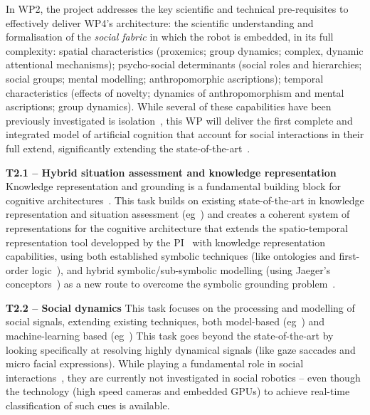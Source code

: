 \documentclass[11pt,a4paper]{report}
\begin{document}
In WP2, the project addresses the key scientific and technical pre-requisites to
effectively deliver WP4's architecture:  the scientific understanding and
formalisation of the \emph{social fabric} in which the robot is embedded, in its
full complexity: spatial characteristics (proxemics; group dynamics; complex,
dynamic attentional mechanisms); psycho-social determinants (social roles and
hierarchies; social groups; mental modelling; anthropomorphic ascriptions);
temporal characteristics (effects of novelty; dynamics of anthropomorphism and
mental ascriptions; group dynamics).  While several of these capabilities have
been previously investigated is isolation~\cite{lemaignan2014dynamics,
flook2019impact,lemaignan2015youre, fink2014which, ros2010which,
warnier2012when, lemaignan2015mutual, dillenbourg2016symmetry,
winkle2019effective}, this WP will deliver the first complete and integrated
model of artificial cognition that account for social interactions in their full
extend, significantly extending the state-of-the-art~\cite{lemaignan2017artificial,
baxter2016cognitive}.


\textbf{T2.1 -- Hybrid situation assessment and knowledge representation}
Knowledge representation and grounding is a fundamental building block for
cognitive architectures~\cite{lemaignan2017artificial,beetz2010cram}. This task
builds on existing state-of-the-art in knowledge representation and situation
assessment (eg~\cite{citeneeded}) and creates a coherent system of
representations for the cognitive architecture that extends the 
spatio-temporal representation tool developped by the
PI~\cite{lemaignan2018underworlds,sallami2019simulation} with knowledge
representation capabilities, using both established symbolic techniques (like
ontologies and first-order logic~\cite{lemaignan2010oro, tenorth2009knowrob}),
and hybrid symbolic/sub-symbolic modelling (using Jaeger's
conceptors~\cite{jaeger2014controlling}) as a new route to overcome the symbolic
grounding problem~\cite{harnad1990symbol}.

\textbf{T2.2 -- Social dynamics} This task focuses on the processing and
modelling of social signals, extending existing techniques, both model-based
(eg~\cite{lemaignan2016realtime,others}) and machine-learning based
(eg~\cite{chetouani,others}) This task goes beyond the state-of-the-art by
looking specifically at resolving highly dynamical signals (like gaze saccades
and micro facial expressions). While playing a fundamental role in social
interactions~\cite{citeneeded}, they are currently not investigated in social
robotics -- even though the technology (high speed cameras and embedded GPUs) to
achieve real-time classification of such cues is available.
\end{document}

